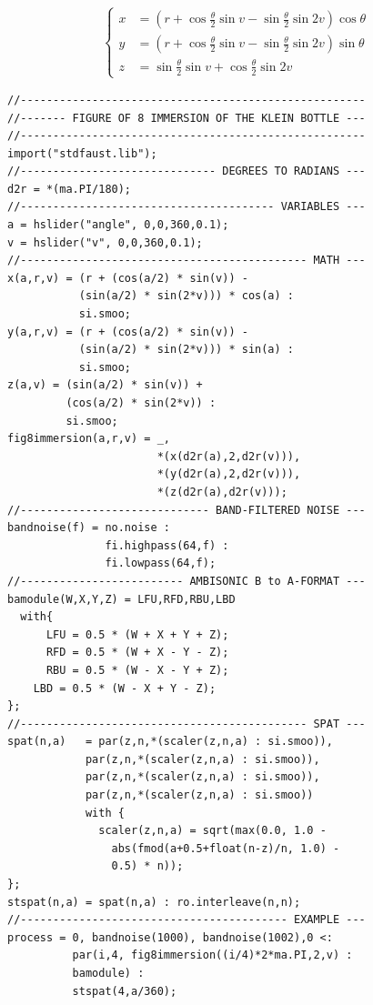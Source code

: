 \begin{equation}
\left\{ \begin{aligned}
x & = \left(r + \cos\frac{\theta}{2}\sin v - \sin\frac{\theta}{2}\sin 2v\right) \cos \theta\\
y & = \left(r + \cos\frac{\theta}{2}\sin v - \sin\frac{\theta}{2}\sin 2v\right) \sin \theta\\
z & = \sin\frac{\theta}{2}\sin v + \cos\frac{\theta}{2}\sin 2v
\end{aligned} \right.
\end{equation}

\begin{lstlisting}
//-----------------------------------------------------
//------- FIGURE OF 8 IMMERSION OF THE KLEIN BOTTLE ---
//-----------------------------------------------------
import("stdfaust.lib");
//------------------------------ DEGREES TO RADIANS ---
d2r = *(ma.PI/180);
//--------------------------------------- VARIABLES ---
a = hslider("angle", 0,0,360,0.1);
v = hslider("v", 0,0,360,0.1);
//-------------------------------------------- MATH ---
x(a,r,v) = (r + (cos(a/2) * sin(v)) -
           (sin(a/2) * sin(2*v))) * cos(a) :
           si.smoo;
y(a,r,v) = (r + (cos(a/2) * sin(v)) -
           (sin(a/2) * sin(2*v))) * sin(a) :
           si.smoo;
z(a,v) = (sin(a/2) * sin(v)) +
         (cos(a/2) * sin(2*v)) :
         si.smoo;
fig8immersion(a,r,v) = _,
                       *(x(d2r(a),2,d2r(v))),
                       *(y(d2r(a),2,d2r(v))),
                       *(z(d2r(a),d2r(v)));
//----------------------------- BAND-FILTERED NOISE ---
bandnoise(f) = no.noise :
               fi.highpass(64,f) :
               fi.lowpass(64,f);
//------------------------- AMBISONIC B to A-FORMAT ---
bamodule(W,X,Y,Z) = LFU,RFD,RBU,LBD
  with{
	  LFU = 0.5 * (W + X + Y + Z);
	  RFD = 0.5 * (W + X - Y - Z);
	  RBU = 0.5 * (W - X - Y + Z);
    LBD = 0.5 * (W - X + Y - Z);
};
//-------------------------------------------- SPAT ---
spat(n,a)	= par(z,n,*(scaler(z,n,a) : si.smoo)),
            par(z,n,*(scaler(z,n,a) : si.smoo)),
            par(z,n,*(scaler(z,n,a) : si.smoo)),
            par(z,n,*(scaler(z,n,a) : si.smoo))
            with {
              scaler(z,n,a) = sqrt(max(0.0, 1.0 -
                abs(fmod(a+0.5+float(n-z)/n, 1.0) -
                0.5) * n));
};
stspat(n,a) = spat(n,a) : ro.interleave(n,n);
//----------------------------------------- EXAMPLE ---
process = 0, bandnoise(1000), bandnoise(1002),0 <:
          par(i,4, fig8immersion((i/4)*2*ma.PI,2,v) :
          bamodule) :
          stspat(4,a/360);
\end{lstlisting}



